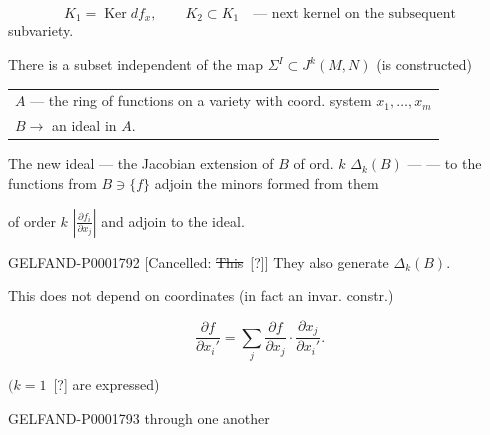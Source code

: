 \begin{equation*}K_1=\operatorname{Ker}df_x,\qquad K_2\subset K_1\quad\text{— next kernel on the subsequent}\end{equation*}
subvariety.

There is a subset independent of the map $\Sigma^I\subset J^k (M, N)$ (is constructed)

\begin{tabular}{||p{.90\linewidth}}
$A$ — the ring of functions on a variety with coord. system $x_1,\ldots, x_m$\\
$B\longrightarrow$ an ideal in $A$.
\end{tabular}

The new ideal — the Jacobian extension of $B$ of ord. $k$ $\Delta_k (B)$ — — to the functions from $B\ni\{f\}$ adjoin the minors formed from them

of order $k$ $\left|\frac{\partial f_i}{\partial x_j}\right|$ and adjoin to the ideal.

\begin{GelfandAdjacentEvidence}{GELFAND-P000179}{2}
[Cancelled: \sout{This}\, [?]] They also generate $\Delta_k (B)$.
\end{GelfandAdjacentEvidence}

This does not depend on coordinates (in fact an invar. constr.)

\begin{equation*}\frac{\partial f}{\partial x_i'}=\sum_j\frac{\partial f}{\partial x_j}\cdot\frac{\partial x_j}{\partial x_i'}.\end{equation*}

$(k=1$\, [?] are expressed)

\begin{GelfandAdjacentEvidence}{GELFAND-P000179}{3}
through one another
\end{GelfandAdjacentEvidence}



\clearpage

